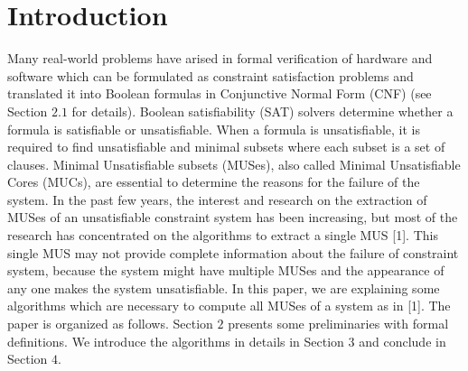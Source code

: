 \section{Introduction}
\label{sec:introduction}
Many real-world problems have arised in formal verification of hardware and software which can be formulated as constraint satisfaction problems and translated it into Boolean formulas in Conjunctive Normal Form (CNF) (see Section $2.1$ for details). Boolean satisfiability (SAT) solvers determine whether a formula is satisfiable or unsatisfiable. When a formula is unsatisfiable, it is required to find unsatisfiable and minimal subsets where each subset is a set of clauses. Minimal Unsatisfiable subsets (MUSes), also called Minimal Unsatisfiable Cores (MUCs), are essential to determine the reasons for the failure of the system. In the past few years, the interest and research on the extraction of MUSes of an unsatisfiable constraint system has been increasing, but most of the research has concentrated on the algorithms to extract a single MUS [1]. This single MUS may not provide complete information about the failure of constraint system, because the system might have multiple MUSes and the appearance of any one makes the system unsatisfiable.\newline
In this paper, we are explaining some algorithms which are necessary to compute all MUSes of a system as in [1]. The paper is organized as follows. Section $2$ presents some preliminaries with formal definitions. We introduce the algorithms in details in Section $3$ and conclude in Section $4$.